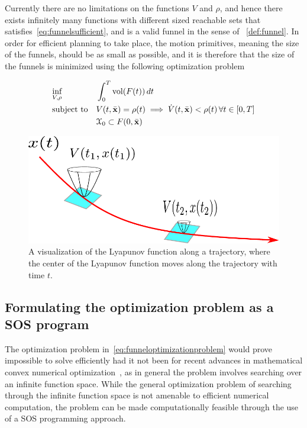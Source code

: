 Currently there are no limitations on the functions \(V\) and \(\rho\), and
hence there exists infinitely many functions with different sized reachable sets
that satisfies~\cref{eq:funnelsufficient}, and is a valid funnel in the sense of
~\cref{def:funnel}. In order for efficient planning to take place, the motion
primitives, meaning the size of the funnels, should be as small as possible, and
it is therefore that the size of the funnels is minimized using the following
optimization problem~\cite{majumdarFunnelLibrariesRealtime2017}

\begin{align}
  \label{eq:funneloptimizationproblem}
  &\underset{V,\rho}{\text{inf}} \; &&\int_{0}^{T} \operatorname{vol}(F(t))\, dt \\
  &\text{subject to} && V(t,\bar{\mathbf{x}}) = \rho (t) \implies \dot{V}(t,\bar{\mathbf{x}}) < \rho (t) \, \forall t \in [0,T] \\
  && &\mathcal{X}_0 \subset F(0,\bar{\mathbf{x}}) \\
\end{align} 

\begin{figure}
  \centering
  \includegraphics[scale=.7]{figures/experiments/lyapunov_visualization}
  \caption{A visualization of the Lyapunov function along a trajectory, where
    the center of the Lyapunov function moves along the trajectory with time
    \(t\).}
\end{figure}


\subsection{Formulating the optimization problem as a SOS program}

The optimization problem in~\cref{eq:funneloptimizationproblem} would prove
impossible to solve efficiently had it not been for recent advances in
mathematical convex numerical
optimization~\cite[Parillo]{parilloStructuredSemidefinitePrograms}, as in
general the problem involves searching over an infinite function space. While
the general optimization problem of searching through the infinite function
space is not amenable to efficient numerical computation, the problem can be
made computationally feasible through the use of a \ac{SOS} programming
approach.

